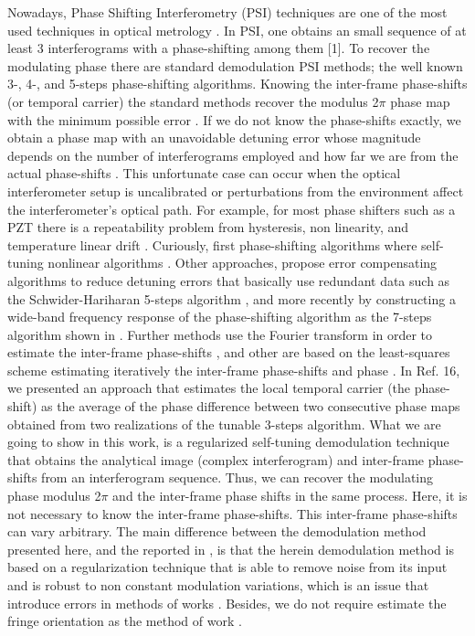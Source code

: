 Nowadays, Phase Shifting Interferometry (PSI) techniques are one of
the most used techniques in optical metrology \cite{a1}. In PSI, one
obtains an small sequence of at least 3 interferograms with a phase-shifting
among them {[}1{]}. To recover the modulating phase there are standard
demodulation PSI methods; the well known 3-, 4-, and 5-steps phase-shifting
algorithms. Knowing the inter-frame phase-shifts (or temporal carrier)
the standard methods recover the modulus 2$\pi$ phase map with the
minimum possible error \cite{a1,a2,a3}. If we
do not know the phase-shifts exactly, we obtain a phase map with an
unavoidable detuning error whose magnitude depends on the number of
interferograms employed and how far we are from the actual phase-shifts
\cite{a3,a4,a5,a6}. This unfortunate case can occur when the optical
interferometer setup is uncalibrated or perturbations from the environment
affect the interferometer\textquoteright{}s optical path. For example,
for most phase shifters such as a PZT there is a repeatability problem
from hysteresis, non linearity, and temperature linear drift \cite{a5,a7}.
Curiously, first phase-shifting algorithms where self-tuning nonlinear
algorithms \cite{a8,a9}. Other approaches, propose error compensating
algorithms to reduce detuning errors that basically use redundant
data such as the Schwider-Hariharan 5-steps algorithm \cite{a4,a10,a11},
and more recently by constructing a wide-band frequency response of
the phase-shifting algorithm as the 7-steps algorithm shown in \cite{a12}.
Further methods use the Fourier transform in order to estimate the
inter-frame phase-shifts \cite{a6,a13}, and other are based on the
least-squares scheme estimating iteratively the inter-frame phase-shifts
and phase \cite{a14,a15}. In Ref. 16\cite{a16}, we presented an
approach that estimates the local temporal carrier (the phase-shift)
as the average of the phase difference between two consecutive phase
maps obtained from two realizations of the tunable 3-steps algorithm.
What we are going to show in this work, is a regularized self-tuning
demodulation technique that obtains the analytical image (complex
interferogram) and inter-frame phase-shifts from an interferogram
sequence. Thus, we can recover the modulating phase modulus 2$\pi$
and the inter-frame phase shifts in the same process. Here, it is
not necessary to know the inter-frame phase-shifts. This inter-frame
phase-shifts can vary arbitrary. The main difference between the demodulation
method presented here, and the reported in \cite{a14,a15,a17}, is
that the herein demodulation method is based on a regularization technique
that is able to remove noise from its input and is robust to non constant
modulation variations, which is an issue that introduce errors in
methods of works \cite{a14,a15}. Besides, we do not require estimate
the fringe orientation as the method of work \cite{a17}.


